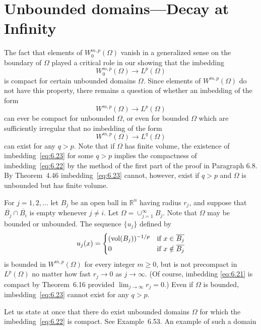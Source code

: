 \section{Unbounded domains---Decay at Infinity}

\begin{para}
  The fact that elements of $W_0^{m,p}(\Omega)$ vanish in a generalized sense on the
  boundary of $\Omega$ played a critical role in our showing that the imbedding
  \begin{equation}\label{eq:6.21}
    W_0^{m,p}(\Omega) \to L^p(\Omega)
  \end{equation}
  is compact for certain unbounded domains $\Omega$. Since elements
  of $W^{m,p}(\Omega)$ do not have this property, there remains a question of whether
  an imbedding of the form
  \begin{equation}\label{eq:6.22}
    W^{m,p}(\Omega) \to L^p(\Omega)
  \end{equation}
  can ever be compact for unbounded $\Omega$, or even for bounded $\Omega$ which are
  sufficiently irregular that no imbedding of the form
  \begin{equation}\label{eq:6.23}
    W^{m,p}(\Omega) \to L^q(\Omega)
  \end{equation}
  can exist for any $q>p$. Note that if $\Omega$ has finite volume, the existence
  of imbedding~\eqref{eq:6.23} for some $q>p$ implies the compactness of imbedding~\eqref{eq:6.22}
  by the method of the first part of the proof in Paragraph 6.8.
  By Theorem~4.46 imbedding~\eqref{eq:6.23} cannot, however, exist if $q>p$ and $\Omega$
  is unbounded but has finite volume.
\end{para}


\begin{example}
  For $j=1,2,\dots$ let $B_j$ be an open ball in $\mathbb{R}^n$ having radius
  $r_j$, and suppose that $\overline{B_j}\cap\overline{B_i}$ is empty whenever
  $j\neq i$. Let $\Omega = \cup_{j=1}^\infty B_j$. Note that $\Omega$ may be
  bounded or unbounded. The sequence $\{u_j\}$ defined by
  \[ u_j(x) = \begin{cases}
    (\operatorname{vol}(B_j))^{-1/p} & \text{if}\ x\in\overline{B_j} \\
    0                  & \text{if}\ x\notin\overline{B_j}
  \end{cases}\]
  is bounded in $W^{m,p}(\Omega)$ for every integer $m\geq 0$, but is not
  precompact in $L^p(\Omega)$ no matter how fast $r_j\to 0$ as $j\to\infty$.
  (Of course, imbedding \eqref{eq:6.21} is compact by Theorem~6.16 provided
  $\lim_{j\to\infty} r_j = 0$.) Even if $\Omega$ is bounded, imbedding~\eqref{eq:6.23}
  cannot exist for any $q>p$.
\end{example}


\begin{para}
  Let us state at once that there do exist unbounded domains $\Omega$
  for which the imbedding~\eqref{eq:6.22} is compact. See Example~6.53.
  An example of such a domain
\end{para}